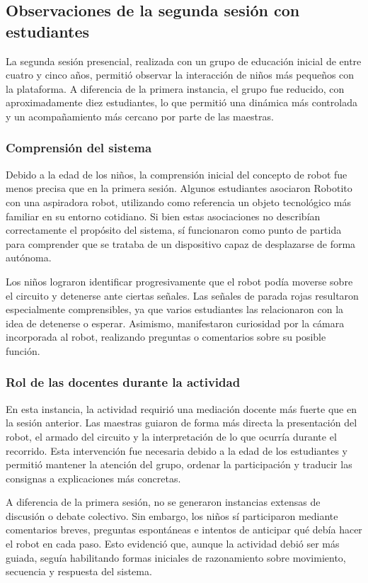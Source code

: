 \documentclass{prgrado}
\begin{document}
\subsection{Observaciones de la segunda sesión con estudiantes}
La segunda sesión presencial, realizada con un grupo de educación inicial de entre cuatro y cinco años, permitió observar la interacción de niños más pequeños con la plataforma. A diferencia de la primera instancia, el grupo fue reducido, con aproximadamente diez estudiantes, lo que permitió una dinámica más controlada y un acompañamiento más cercano por parte de las maestras.
\subsubsection{Comprensión del sistema}
Debido a la edad de los niños, la comprensión inicial del concepto de robot fue menos precisa que en la primera sesión. Algunos estudiantes asociaron Robotito con una aspiradora robot, utilizando como referencia un objeto tecnológico más familiar en su entorno cotidiano. Si bien estas asociaciones no describían correctamente el propósito del sistema, sí funcionaron como punto de partida para comprender que se trataba de un dispositivo capaz de desplazarse de forma autónoma.

Los niños lograron identificar progresivamente que el robot podía moverse sobre el circuito y detenerse ante ciertas señales. Las señales de parada rojas resultaron especialmente comprensibles, ya que varios estudiantes las relacionaron con la idea de detenerse o esperar. Asimismo, manifestaron curiosidad por la cámara incorporada al robot, realizando preguntas o comentarios sobre su posible función.
\subsubsection{Rol de las docentes durante la actividad}
En esta instancia, la actividad requirió una mediación docente más fuerte que en la sesión anterior. Las maestras guiaron de forma más directa la presentación del robot, el armado del circuito y la interpretación de lo que ocurría durante el recorrido. Esta intervención fue necesaria debido a la edad de los estudiantes y permitió mantener la atención del grupo, ordenar la participación y traducir las consignas a explicaciones más concretas.

A diferencia de la primera sesión, no se generaron instancias extensas de discusión o debate colectivo. Sin embargo, los niños sí participaron mediante comentarios breves, preguntas espontáneas e intentos de anticipar qué debía hacer el robot en cada paso. Esto evidenció que, aunque la actividad debió ser más guiada, seguía habilitando formas iniciales de razonamiento sobre movimiento, secuencia y respuesta del sistema.
\end{document}
